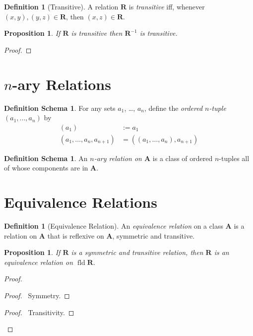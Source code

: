 \documentclass{book}
\let\qed\relax
\newtheorem{prop}[ax]{Proposition}
\theoremstyle{definition}
\newtheorem{df}[ax]{Definition}
\newtheorem{dfs}[ax]{Definition Schema}
\newcommand{\fld}{\ensuremath{\operatorname{fld}}}
\begin{document}
\begin{df}[Transitive]
A relation $\mathbf{R}$ is \emph{transitive} iff, whenever $(x,y), (y,z) \in \mathbf{R}$, then $(x,z) \in \mathbf{R}$.
\end{df}

\begin{prop}
\label{prop:invtrans}
If $\mathbf{R}$ is transitive then $\mathbf{R}^{-1}$ is transitive.
\end{prop}

\begin{proof}
\pf
{}
\qed
\end{proof}

\section{$n$-ary Relations}

\begin{dfs}
For any sets $a_1$, \ldots, $a_n$, define the \emph{ordered $n$-tuple} $(a_1, \ldots, a_n)$ by
\begin{align*}
(a_1) & := a_1 \\
(a_1, \ldots, a_n, a_{n+1}) & = ((a_1, \ldots, a_n), a_{n+1})
\end{align*}
\end{dfs}

\begin{dfs}
An \emph{$n$-ary relation on $\mathbf{A}$} is a class of ordered $n$-tuples all of whose components are in $\mathbf{A}$.
\end{dfs}

\section{Equivalence Relations}

\begin{df}[Equivalence Relation]
An \emph{equivalence relation} on a class $\mathbf{A}$ is a relation on $\mathbf{A}$ that is reflexive on $\mathbf{A}$, symmetric and transitive.
\end{df}

\begin{prop}
If $\mathbf{R}$ is a symmetric and transitive relation, then $\mathbf{R}$ is an equivalence relation on $\fld \mathbf{R}$.
\end{prop}

\begin{proof}
\pf
\step{1}{\pflet{$x \in \fld \mathbf{R}$} \prove{$(x,x) \in \mathbf{R}$}}
\begin{proof}
	\pf\ Symmetry.
\end{proof}
\begin{proof}
	\pf\ Transitivity.
\end{proof}
\qed
\end{proof}
\end{document}
